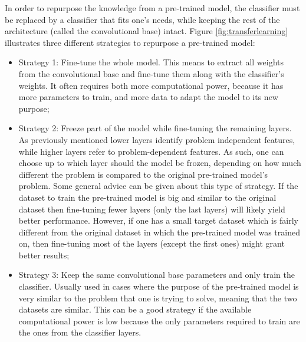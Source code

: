     In order to repurpose the knowledge from a pre-trained model, the classifier must be replaced by a classifier that fits one's needs, while keeping the rest of the architecture (called the convolutional base) intact. Figure \ref{fig:transferlearning} illustrates three different strategies to repurpose a pre-trained model:
    \begin{itemize}
        \item Strategy 1: Fine-tune the whole model. This means to extract all weights from the convolutional base and fine-tune them along with the classifier's weights. It often requires both more computational power, because it has more parameters to train, and more data to adapt the model to its new purpose;
        \item Strategy 2: Freeze part of the model while fine-tuning the remaining layers. As previously mentioned lower layers identify problem independent features, while higher layers refer to problem-dependent features. As such, one can choose up to which layer should the model be frozen, depending on how much different the problem is compared to the original pre-trained model's problem. Some general advice can be given about this type of strategy. If the dataset to train the pre-trained model is big and similar to the original dataset then fine-tuning fewer layers (only the last layers) will likely yield better performance. However, if one has a small target dataset which is fairly different from the original dataset in which the pre-trained model was trained on, then fine-tuning most of the layers (except the first ones) might grant better results;
        \item Strategy 3: Keep the same convolutional base parameters and only train the classifier. Usually used in cases where the purpose of the pre-trained model is very similar to the problem that one is trying to solve, meaning that the two datasets are similar. This can be a good strategy if the available computational power is low because the only parameters required to train are the ones from the classifier layers.
    \end{itemize}
    
